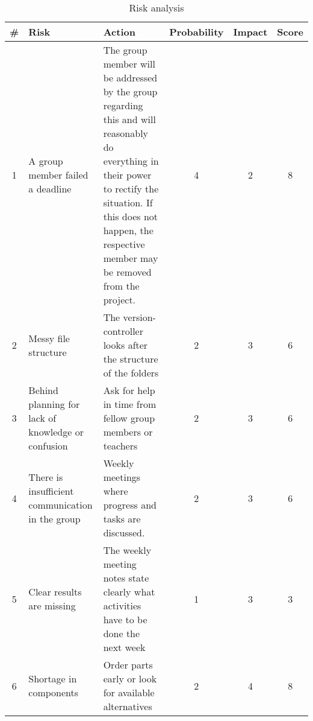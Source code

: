 \renewcommand\tabularxcolumn[1]{m{#1}}%

\begin{table}[!h]
	\begin{tabularx}{\textwidth}{|c|X|X|c|c|c|} \hline
		\# 	& Risk 													& Action 																				& Probability 	& Impact 	& Score 	\\ \hline
		1 	& A group member failed a deadline			            & The group member will be addressed by the group regarding this and will reasonably do everything in their power to rectify the situation. If this does not happen, the respective member may be removed from the project.										& 4	& 2			& \cellcolor{yellow}8	\\ \hline
		2 	& Messy file structure									& The version-controller looks after the structure of the folders						& 2	& 3			& \cellcolor{yellow}6	\\ \hline
		3 	& Behind planning for lack of knowledge or confusion	& Ask for help in time from fellow group members or teachers							& 2	& 3			& \cellcolor{yellow}6	\\ \hline
		4 	& There is insufficient communication in the group		& Weekly meetings where progress and tasks are discussed.								& 2	& 3			& \cellcolor{yellow}6	\\ \hline
		5 	& Clear results are missing								& The weekly meeting notes state clearly what activities have to be done the next week	& 1	& 3			& \cellcolor{green}3	\\ \hline
		6 	& Shortage in components								& Order parts early or look for available alternatives									& 2	& 4			& \cellcolor{yellow}8	\\ \hline
	\end{tabularx}
	\caption{Risk analysis}
\end{table}